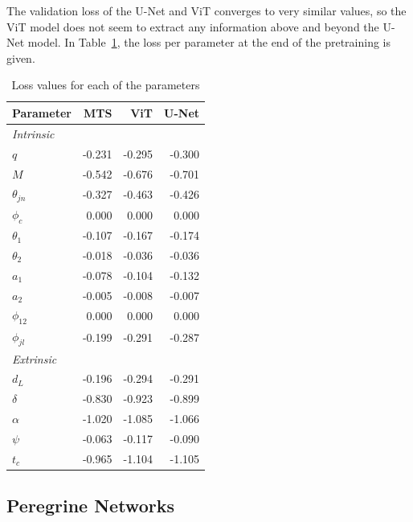 The validation loss of the U-Net and ViT converges to very similar values, so the ViT model does not seem to extract any information above and beyond the U-Net model. In Table~\ref{tab:loss_pretraining}, the loss per parameter at the end of the pretraining is given. 

\begin{table}[htb]
    \caption{Loss values for each of the parameters}
    \label{tab:loss_pretraining}
    \setlength\extrarowheight{-1pt}
    \begin{tabular}{lrrr}
    \toprule
    Parameter & MTS & ViT & U-Net \\
    \midrule
    \textit{Intrinsic} &&& \\
    $q$ & -0.231 & -0.295 & -0.300 \\
    $M$ & -0.542 & -0.676 & -0.701 \\
    $\theta_{jn}$ & -0.327 & -0.463 & -0.426 \\
    $\phi_c$ & 0.000 & 0.000 & 0.000 \\
    $\theta_1$ & -0.107 & -0.167 & -0.174 \\
    $\theta_2$ & -0.018 & -0.036 & -0.036 \\
    $a_1$ & -0.078 & -0.104 & -0.132 \\
    $a_2$ & -0.005 & -0.008 & -0.007 \\
    $\phi_{12}$ & 0.000 & 0.000 & 0.000 \\
    $\phi_{jl}$ & -0.199 & -0.291 & -0.287 \\
    \midrule
    \textit{Extrinsic} &&& \\
    $d_L$ & -0.196 & -0.294 & -0.291 \\
    $\delta$ & -0.830 & -0.923 & -0.899 \\
    $\alpha$ & -1.020 & -1.085 & -1.066 \\
    $\psi$ & -0.063 & -0.117 & -0.090 \\
    $t_c$ & -0.965 & -1.104 & -1.105 \\
    \bottomrule
    \end{tabular}
    \myvspacecommand
\end{table}

\subsection{Peregrine Networks}

